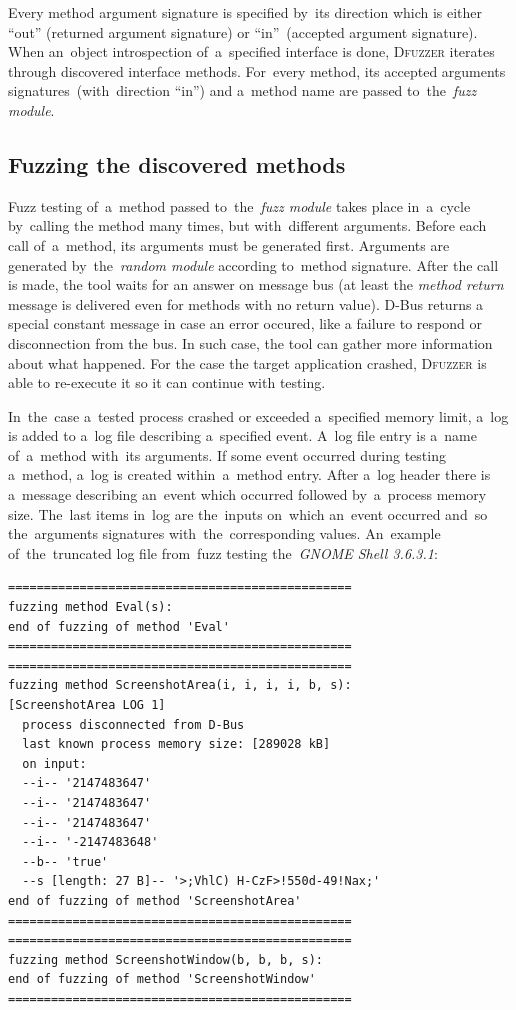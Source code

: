 \documentclass[conference]{IEEEtran}
\begin{document}
Every method argument signature is specified by~its
direction which is either ``out'' (returned argument signature) or
``in''~(accepted argument signature). When an~object introspection of~a~specified
interface is done, \textsc{Dfuzzer} iterates through discovered interface
methods. For~every method, its accepted arguments signatures~(with~direction
``in'') and a~method name are passed to~the~\emph{fuzz module}.

\subsection{Fuzzing the discovered methods} Fuzz testing of~a~method passed
to~the~\emph{fuzz module} takes place in~a~cycle by~calling the method many
times, but with~different arguments.  Before each call of~a~method, its
arguments must be generated first. Arguments are generated by~the~\emph{random
module} according to~method signature. After the call is made, the tool waits
for an answer on message bus (at least the \textit{method return} message is
delivered even for methods with no return value). D-Bus returns a special
constant message in case an error occured, like a failure to respond or
disconnection from the bus. In such case, the tool can gather more information
about what happened.  For the case the target application crashed,
\textsc{Dfuzzer} is able to re-execute it so it can continue with testing.


In~the~case a~tested process crashed or exceeded a~specified memory limit,
a~log is added to a~log file describing a~specified event. A~log file entry is
a~name of~a~method with~its arguments. If some event occurred during testing
a~method, a~log is created within~a~method entry. After a~log header there is
a~message describing an~event which occurred followed by~a~process memory size.
The~last items in~log are the~inputs on~which an~event occurred and~so
the~arguments signatures with~the~corresponding values. An~example
of~the~truncated log file from~fuzz testing the~\emph{GNOME Shell 3.6.3.1}:


{
\footnotesize
\begin{verbatim}
================================================
fuzzing method Eval(s):
end of fuzzing of method 'Eval'
================================================
================================================
fuzzing method ScreenshotArea(i, i, i, i, b, s):
[ScreenshotArea LOG 1]
  process disconnected from D-Bus
  last known process memory size: [289028 kB]
  on input:
  --i-- '2147483647'
  --i-- '2147483647'
  --i-- '2147483647'
  --i-- '-2147483648'
  --b-- 'true'
  --s [length: 27 B]-- '>;VhlC) H-CzF>!550d-49!Nax;'
end of fuzzing of method 'ScreenshotArea'
================================================
================================================
fuzzing method ScreenshotWindow(b, b, b, s):
end of fuzzing of method 'ScreenshotWindow'
================================================
\end{verbatim}
}
\end{document}
